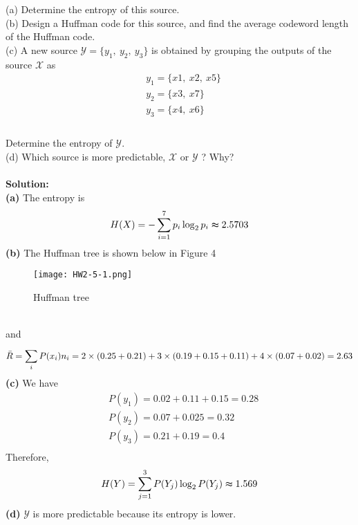 \documentclass[a4paper,12pt]{article}
\begin{document}
\begin{enumerate}
            (a) Determine the entropy of this source. \\ 
            (b) Design a Huffman code for this source, and find the average codeword length of the Huffman code. \\ 
            (c) A new source $\mathcal{Y} = \{ y_1, \ y_2, \ y_3 \}$ is obtained by grouping the outputs of the source $\mathcal{X}$ as 
            $$ 
            \begin{aligned}
                & y_1 = \{ x1, \ x2, \ x5 \} \\
                & y_2 = \{ x3, \ x7 \} \\ 
                & y_3 = \{ x4, \ x6 \} \\
            \end{aligned}
            $$ \\
            Determine the entropy of $\mathcal{Y}$. \\
            (d) Which source is more predictable, $\mathcal{X}$ or $\mathcal{Y}$ ? Why? \\ \\
            \textbf{Solution:} \\
            \textbf{(a)} 
            The entropy is $$H(X) = - \sum_{i = 1}^{7} p_i \log_2 p_i \thickapprox 2.5703$$
            \textbf{(b)} 
            The Huffman tree is shown below in Figure 4
            \begin{figure}[h]
                \centering
                \texttt{[image: HW2-5-1.png]}
                \caption{Huffman tree}
            \end{figure} \\ 
            and $$\Bar{R} = \sum_{i}^{}P(x_{i})n_{i} = 2 \times (0.25 + 0.21) + 3 \times (0.19 + 0.15 + 0.11) + 4 \times (0.07 + 0.02) = 2.63$$
            \textbf{(c)} 
            We have
            $$ 
            \begin{aligned}
                & P(y_1) = 0.02 + 0.11 + 0.15 = 0.28 \\
                & P(y_2) = 0.07 + 0.025 = 0.32 \\ 
                & P(y_3) = 0.21 + 0.19 = 0.4 \\
            \end{aligned}
            $$
            Therefore, $$H(Y) = \sum_{j = 1}^{3} P(Y_j) \log_2 P(Y_j) \thickapprox 1.569$$
            \textbf{(d)}
            $\mathcal{Y}$ is more predictable because its entropy is lower.

\end{enumerate}
\end{document}
